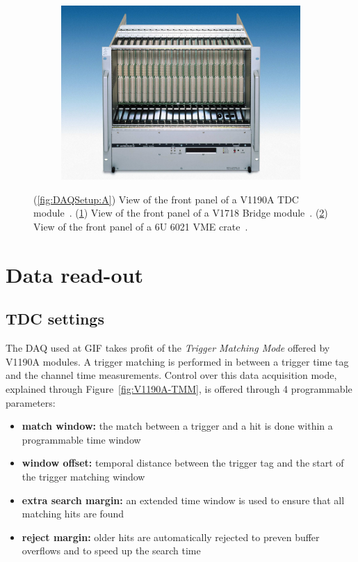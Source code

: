 \begin{figure}[H]
\begin{subfigure}{0.5\linewidth}
			\caption{\label{fig:DAQSetup:B}}
		\end{subfigure}
		\begin{subfigure}{\linewidth}
		    \centering
			\includegraphics[width = 0.8\plotwidth]{fig/app1/Wiener-front.png}
			\caption{\label{fig:DAQSetup:C}}
		\end{subfigure}
		\caption{\label{fig:DAQSetup} (\ref{fig:DAQSetup:A}) View of the front panel of a V1190A TDC module~\cite{V1190AMUT}. (\ref{fig:DAQSetup:B}) View of the front panel of a V1718 Bridge module~\cite{V1718MUT}. (\ref{fig:DAQSetup:C}) View of the front panel of a 6U 6021 VME crate~\cite{6U6000MUT}.}
	\end{figure}

\section{Data read-out}
\label{app1:sec:Data}

    \subsection{TDC settings}
    \label{app1:ssec:TDC}

	The DAQ used at GIF takes profit of the \textit{Trigger Matching Mode} offered by V1190A modules. A trigger matching is performed in between a trigger time tag and the channel time measurements. Control over this data acquisition mode, explained through Figure~\ref{fig:V1190A-TMM}, is offered through 4 programmable parameters:
        
	\begin{itemize}
		\item \textbf{match window:} the match between a trigger and a hit is done within a programmable time window
		\item \textbf{window offset:} temporal distance between the trigger tag and the start of the trigger matching window
		\item \textbf{extra search margin:} an extended time window is used to ensure that all matching hits are found
		\item \textbf{reject margin:} older hits are automatically rejected to preven buffer overflows and to speed up the search time
	\end{itemize}
    
